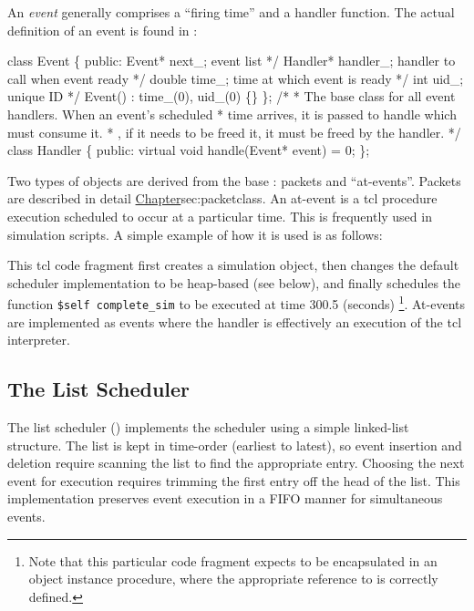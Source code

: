 An {\em event} generally comprises a ``firing time'' and a handler function.
The actual definition of an event is found in :
\begin{program}
        class Event \{ 
        public: 
                Event* next_;           \* event list */ 
                Handler* handler_;      \* handler to call when event ready */
                double time_;           \* time at which event is ready */
                int uid_;               \* unique ID */
                Event() : time_(0), uid_(0) \{\}
        \};   
        /*   
         * {\cf The base class for all event handlers.  When an event's scheduled}
         * {\cf time arrives, it is passed to handle which must consume it.}
         * {\ie, if it needs to be freed it, it must be freed by the handler.}
         */  
        class Handler \{
         public: 
                virtual void handle(Event* event) = 0;
        \};   
\end{program}
Two types of objects are derived from the base
: packets and ``at-events''.
Packets are described in detail 
\href{in the next chapter}{Chapter}{sec:packetclass}.
An at-event is a tcl procedure execution scheduled to occur at
a particular time. 
This is frequently used in simulation scripts.
A simple example of how it is used is as follows:
This tcl code fragment first creates a simulation object,
then changes the default scheduler implementation to be heap-based
(see below), and finally schedules the function {\tt \$self complete\_sim}
to be executed at time 300.5 (seconds)%
\footnote{Note that this particular code fragment expects to be encapsulated 
in an object instance procedure, where the appropriate
reference to  is correctly defined.}.
At-events are implemented as events where the handler is
effectively an execution of the tcl interpreter.

\subsection{The List Scheduler}
\label{sec:listsched}

The list scheduler ()
implements the scheduler using a simple linked-list structure.
The list is kept in time-order (earliest to latest), so event
insertion and deletion require scanning the list to find the
appropriate entry.
Choosing the next event for execution requires trimming the first
entry off the head of the list.
This implementation preserves event execution in a FIFO manner
for simultaneous events.

